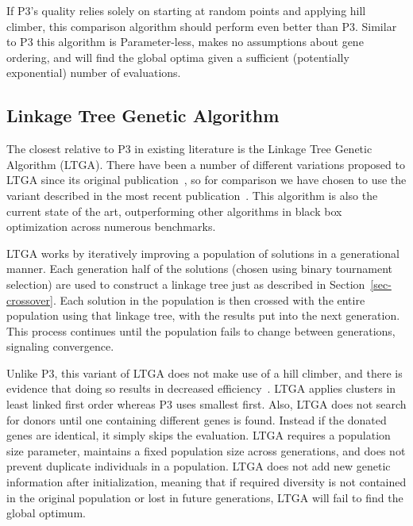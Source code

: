 \documentclass{sig-alternate}
\begin{document}
If P3's quality relies solely on starting at random points and applying hill climber,
this comparison algorithm should perform even better than P3.  Similar to P3 this
algorithm is Parameter-less, makes no assumptions about gene ordering, and will
find the global optima given a sufficient (potentially exponential) number of evaluations.

\subsection{Linkage Tree Genetic Algorithm}
\label{sec-ltga}
The closest relative to P3 in existing literature is the Linkage Tree Genetic Algorithm
(LTGA).  There have been a number of different variations proposed to LTGA since
its original publication~\cite{thierens:2010:ltga}, so for comparison we have chosen
to use the variant described in the most recent publication~\cite{thierens:2013:ltgahiff}.
This algorithm is also the current state of the art, outperforming other algorithms
in black box optimization across numerous benchmarks.

LTGA works by iteratively improving a population of solutions in a generational manner.
Each generation half of the solutions (chosen using binary tournament selection)
are used to construct a linkage tree just as described in Section~\ref{sec-crossover}.
Each solution in the population is then crossed with the entire population using that
linkage tree, with the results put into the next generation.  This process continues
until the population fails to change between generations, signaling convergence.

Unlike P3, this variant of LTGA does not make use of a hill climber, and there is evidence that
doing so results in decreased efficiency~\cite{bosman:2011:lsbbo}.  LTGA applies
clusters in least linked first order whereas P3 uses smallest first.  Also, LTGA
does not search for donors until one containing different genes is found.  Instead
if the donated genes are identical, it simply skips the evaluation.  LTGA
requires a population size parameter, maintains a fixed population size across
generations, and does not prevent duplicate individuals in a population.  LTGA
does not add new genetic information after initialization, meaning that if
required diversity is not contained in the original population or lost in future
generations, LTGA will fail to find the global optimum.
\end{document}
